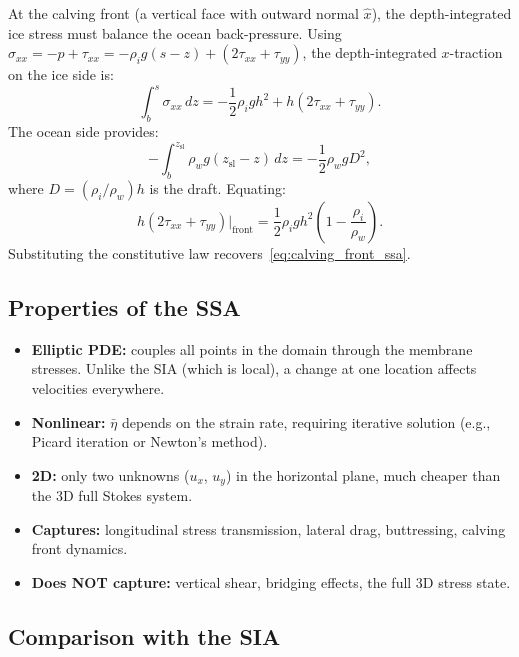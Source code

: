 \documentclass[11pt]{article}
\begin{document}
At the calving front (a vertical face with outward normal $\hat{x}$), the depth-integrated ice stress must balance the ocean back-pressure.  Using $\sigma_{xx} = -p + \tau_{xx} = -\rho_i g(s-z) + (2\tau_{xx} + \tau_{yy})$, the depth-integrated $x$-traction on the ice side is:
\begin{equation}
  \int_b^s \sigma_{xx}\,dz = -\frac{1}{2}\rho_i g h^2 + h(2\tau_{xx} + \tau_{yy}).
\end{equation}
The ocean side provides:
\begin{equation}
  -\int_b^{z_{\text{sl}}} \rho_w g(z_{\text{sl}} - z)\,dz = -\frac{1}{2}\rho_w g D^2,
\end{equation}
where $D = (\rho_i/\rho_w)h$ is the draft.  Equating:
\begin{equation}
  h(2\tau_{xx} + \tau_{yy})\big|_{\text{front}} = \frac{1}{2}\rho_i g h^2\!\left(1 - \frac{\rho_i}{\rho_w}\right).
  \label{eq:calving_bc_stress}
\end{equation}
Substituting the constitutive law recovers~\eqref{eq:calving_front_ssa}.

\subsection{Properties of the SSA}

\begin{itemize}
  \item \textbf{Elliptic PDE:} couples all points in the domain through the membrane stresses.  Unlike the SIA (which is local), a change at one location affects velocities everywhere.
  \item \textbf{Nonlinear:} $\bar{\eta}$ depends on the strain rate, requiring iterative solution (e.g., Picard iteration or Newton's method).
  \item \textbf{2D:} only two unknowns ($u_x$, $u_y$) in the horizontal plane, much cheaper than the 3D full Stokes system.
  \item \textbf{Captures:} longitudinal stress transmission, lateral drag, buttressing, calving front dynamics.
  \item \textbf{Does NOT capture:} vertical shear, bridging effects, the full 3D stress state.
\end{itemize}

\subsection{Comparison with the SIA}
\end{document}
